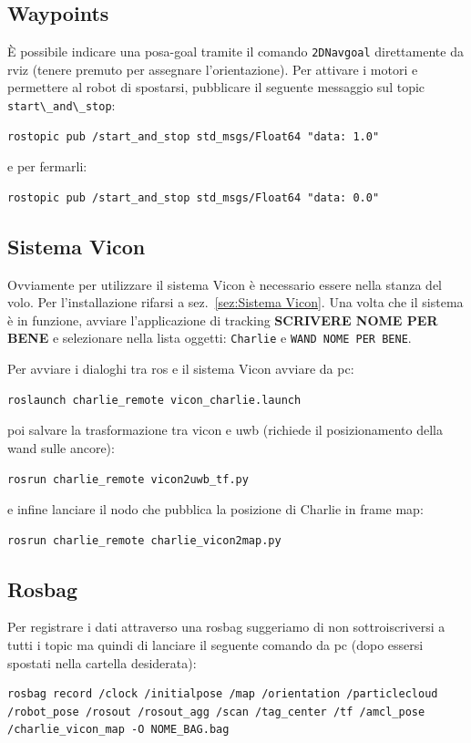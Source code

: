 \subsection*{Waypoints}
\`E possibile indicare una posa-goal tramite il comando \texttt{2DNavgoal} direttamente da rviz (tenere premuto per assegnare l'orientazione).
Per attivare i motori e permettere al robot di spostarsi, pubblicare il seguente messaggio sul topic \verb|start\_and\_stop|:

\begin{lstlisting}[style=bash]
	rostopic pub /start_and_stop std_msgs/Float64 "data: 1.0"
\end{lstlisting}

e per fermarli:

\begin{lstlisting}[style=bash]
	rostopic pub /start_and_stop std_msgs/Float64 "data: 0.0"
\end{lstlisting}

\subsection*{Sistema Vicon}
Ovviamente per utilizzare il sistema Vicon \`e necessario essere nella stanza del volo. Per l'installazione rifarsi a sez.~\ref{sez:Sistema Vicon}. Una volta che il sistema \`e in funzione, avviare l'applicazione di tracking \textbf{SCRIVERE NOME PER BENE} e selezionare nella lista oggetti: \texttt{Charlie} e \texttt{WAND NOME PER BENE}.

Per avviare i dialoghi tra ros e il sistema Vicon avviare da pc:
\begin{lstlisting}[style=bashPC]
	roslaunch charlie_remote vicon_charlie.launch
\end{lstlisting}

poi salvare la trasformazione tra vicon e uwb (richiede il posizionamento della wand sulle ancore):
\begin{lstlisting}[style=bashPC]
	rosrun charlie_remote vicon2uwb_tf.py
\end{lstlisting}

e infine lanciare il nodo che pubblica la posizione di Charlie in frame map:
\begin{lstlisting}[style=bashPC]
	rosrun charlie_remote charlie_vicon2map.py
\end{lstlisting}


\subsection*{Rosbag}
Per registrare i dati attraverso una rosbag suggeriamo di non sottroiscriversi a tutti i topic ma quindi di lanciare il seguente comando da pc (dopo essersi spostati nella cartella desiderata):
\begin{lstlisting}[style=bashPC]
	rosbag record /clock /initialpose /map /orientation /particlecloud /robot_pose /rosout /rosout_agg /scan /tag_center /tf /amcl_pose /charlie_vicon_map -O NOME_BAG.bag
\end{lstlisting}

